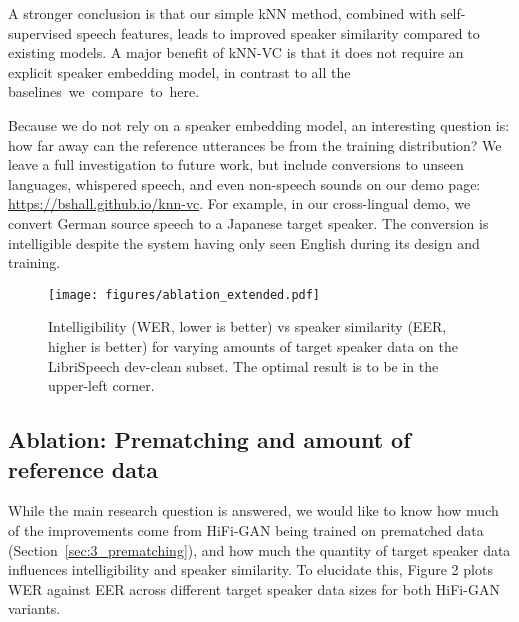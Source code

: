 \documentclass{INTERSPEECH2023}
\begin{document}
A stronger conclusion is that
our simple kNN method, combined with self-supervised speech features, leads to improved speaker similarity compared to existing models.
A major benefit of kNN-VC is that it does not require an explicit speaker embedding model, in contrast to all the \mbox{baselines we compare to here.}

Because we do not rely on a speaker embedding model, an interesting question is: how far away can the reference utterances be from the training distribution?
We leave a full investigation to future work, but include conversions to unseen languages, whispered speech, and even non-speech sounds on our demo page:
{\footnotesize \url{https://bshall.github.io/knn-vc}}.
For example, in our cross-lingual demo, we convert German source speech to a Japanese target speaker.
The conversion is intelligible despite the system having only seen English during its design and training.


\begin{figure}[t!]
\centering
\centerline{\texttt{[image: figures/ablation\_extended.pdf]}}
\caption{
    Intelligibility (WER, lower is better) vs speaker similarity (EER, higher is better) for varying amounts of target speaker data on the LibriSpeech dev-clean subset.
        The optimal result is to be in the upper-left corner.
    }
\label{fig:2_ablation}
\end{figure}

\subsection{Ablation: Prematching and amount of reference data}\label{subsec:5.2_ablation}

While the main research question is answered,
we would like to know
how much of the improvements come from HiFi-GAN being trained on prematched data (Section~\ref{sec:3_prematching}), and how much the quantity of target speaker data influences intelligibility and speaker similarity. 
To elucidate this, Figure 2 plots WER against EER across different target speaker data sizes for both HiFi-GAN variants. \\
\end{document}

